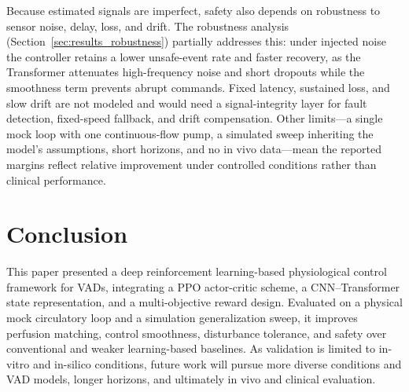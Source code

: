 \documentclass[sigconf]{acmart}
\begin{document}
Because estimated signals are imperfect, safety also depends on robustness to sensor noise, delay, loss, and drift. The robustness analysis (Section~\ref{sec:results_robustness}) partially addresses this: under injected noise the controller retains a lower unsafe-event rate and faster recovery, as the Transformer attenuates high-frequency noise and short dropouts while the smoothness term prevents abrupt commands. Fixed latency, sustained loss, and slow drift are not modeled and would need a signal-integrity layer for fault detection, fixed-speed fallback, and drift compensation. Other limits---a single mock loop with one continuous-flow pump, a simulated sweep inheriting the model's assumptions, short horizons, and no in vivo data---mean the reported margins reflect relative improvement under controlled conditions rather than clinical performance.

\section{Conclusion}
This paper presented a deep reinforcement learning-based physiological control framework for VADs, integrating a PPO actor-critic scheme, a CNN--Transformer state representation, and a multi-objective reward design. Evaluated on a physical mock circulatory loop and a simulation generalization sweep, it improves perfusion matching, control smoothness, disturbance tolerance, and safety over conventional and weaker learning-based baselines. As validation is limited to in-vitro and in-silico conditions, future work will pursue more diverse conditions and VAD models, longer horizons, and ultimately in vivo and clinical evaluation.



\end{document}
